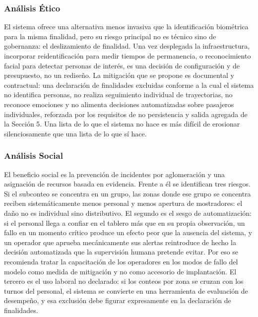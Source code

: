 \subsubsection{Análisis Ético}
\label{sec:impacto-etico}

El sistema ofrece una alternativa menos invasiva que la identificación
biométrica para la misma finalidad, pero su riesgo principal no es
técnico sino de gobernanza: el deslizamiento de finalidad. Una vez
desplegada la infraestructura, incorporar reidentificación para medir
tiempos de permanencia, o reconocimiento facial para detectar personas
de interés, es una decisión de configuración y de presupuesto, no un
rediseño. La mitigación que se propone es documental y contractual: una
declaración de finalidades excluidas conforme a la cual el sistema no
identifica personas, no realiza seguimiento individual de trayectorias,
no reconoce emociones y no alimenta decisiones automatizadas sobre
pasajeros individuales, reforzada por los requisitos de no persistencia
y salida agregada de la Sección 5. Una lista de lo que el sistema no
hace es más difícil de erosionar silenciosamente que una lista de lo que
sí hace.

\subsubsection{Análisis Social}
\label{sec:impacto-social}

El beneficio social es la prevención de incidentes por aglomeración y
una asignación de recursos basada en evidencia. Frente a él se
identifican tres riesgos. Si el subconteo se concentra en un grupo, las
zonas donde ese grupo se concentra reciben sistemáticamente menos
personal y menos apertura de mostradores: el daño no es individual sino
distributivo. El segundo es el sesgo de automatización: si el personal
llega a confiar en el tablero más que en su propia observación, un fallo
en un momento crítico produce un efecto peor que la ausencia del
sistema, y un operador que aprueba mecánicamente sus alertas reintroduce
de hecho la decisión automatizada que la supervisión humana pretende
evitar. Por eso se recomienda tratar la capacitación de los operadores
en los modos de fallo del modelo como medida de mitigación y no como
accesorio de implantación. El tercero es el uso laboral no declarado: si
los conteos por zona se cruzan con los turnos del personal, el sistema
se convierte en una herramienta de evaluación de desempeño, y esa
exclusión debe figurar expresamente en la declaración de finalidades.

